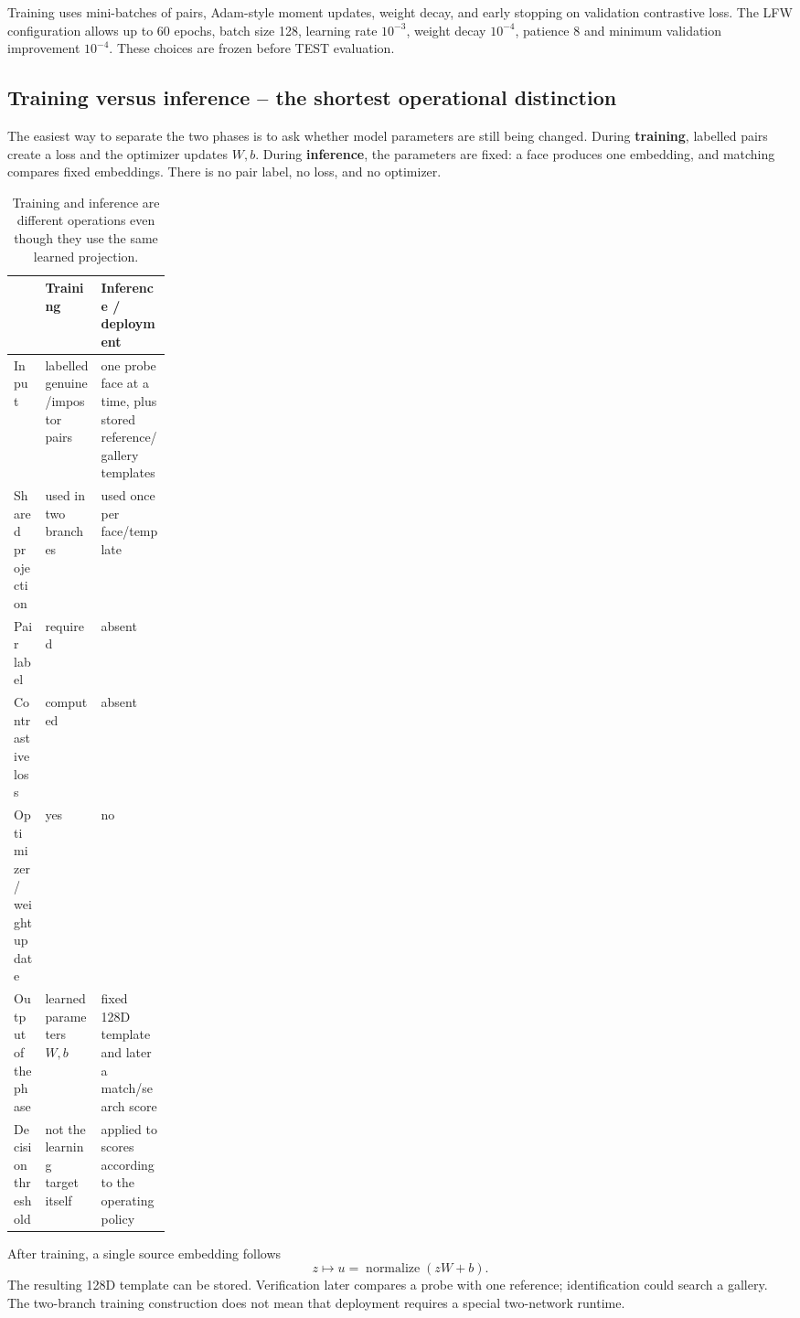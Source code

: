 \documentclass[10pt,a4paper]{article}
\begin{document}
Training uses mini-batches of pairs, Adam-style moment updates, weight decay, and early
stopping on validation contrastive loss. The LFW configuration allows up to 60 epochs, batch
size 128, learning rate $10^{-3}$, weight decay $10^{-4}$, patience 8 and minimum validation
improvement $10^{-4}$. These choices are frozen before TEST evaluation.

\subsection{Training versus inference -- the shortest operational distinction}

The easiest way to separate the two phases is to ask whether model parameters are still
being changed. During \textbf{training}, labelled pairs create a loss and the optimizer
updates $W,b$. During \textbf{inference}, the parameters are fixed: a face produces one
embedding, and matching compares fixed embeddings. There is no pair label, no loss, and no
optimizer.

\begin{table}[ht]
\centering
\caption{Training and inference are different operations even though they use the same
learned projection.}
\label{tab:train-infer}
\small
\begin{tabularx}{\linewidth}{@{}p{0.20\linewidth}XX@{}}
\toprule
 & Training & Inference / deployment\\
\midrule
Input & labelled genuine/impostor pairs & one probe face at a time, plus stored reference/gallery templates\\
Shared projection & used in two branches & used once per face/template\\
Pair label & required & absent\\
Contrastive loss & computed & absent\\
Optimizer / weight update & yes & no\\
Output of the phase & learned parameters $W,b$ & fixed 128D template and later a match/search score\\
Decision threshold & not the learning target itself & applied to scores according to the operating policy\\
\bottomrule
\end{tabularx}
\end{table}

After training, a single source embedding follows
\begin{equation}
z\longmapsto u=\operatorname{normalize}(zW+b).
\end{equation}
The resulting 128D template can be stored. Verification later compares a probe with one
reference; identification could search a gallery. The two-branch training construction does
not mean that deployment requires a special two-network runtime.
\end{document}
